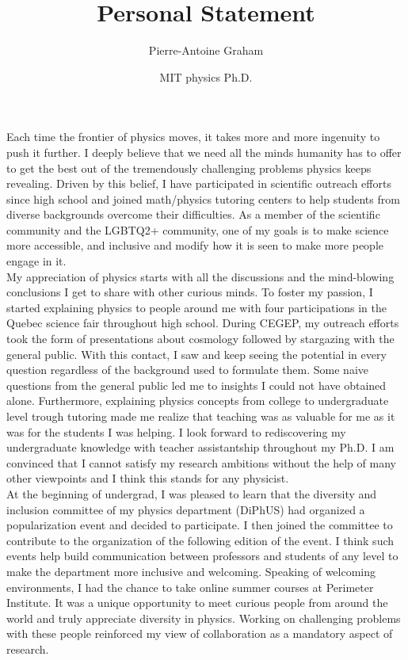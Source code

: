 \documentclass[12pt]{article}
\title{Personal Statement}
\author{Pierre-Antoine Graham}
\date{MIT physics Ph.D.}
\begin{document}
\maketitle
\vspace{0.5cm}

Each time the frontier of physics moves, it takes more and more ingenuity to push it further. I deeply believe that we need all the minds humanity has to offer to get the best out of the tremendously challenging problems physics keeps revealing. Driven by this belief, I have participated in scientific outreach efforts since high school and joined math/physics tutoring centers to help students from diverse backgrounds overcome their difficulties. As a member of the scientific community and the LGBTQ2+ community, one of my goals is to make science more accessible, and inclusive and modify how it is seen to make more people engage in it. \\

My appreciation of physics starts with all the discussions and the mind-blowing conclusions I get to share with other curious minds. To foster my passion, I started explaining physics to people around me with four participations in the Quebec science fair throughout high school. During CEGEP, my outreach efforts took the form of presentations about cosmology followed by stargazing with the general public. With this contact, I saw and keep seeing the potential in every question regardless of the background used to formulate them. Some naive questions from the general public led me to insights I could not have obtained alone. Furthermore, explaining physics concepts from college to undergraduate level trough tutoring made me realize that teaching was as valuable for me as it was for the students I was helping. I look forward to rediscovering my undergraduate knowledge with teacher assistantship throughout my Ph.D. I am convinced that I cannot satisfy my research ambitions without the help of many other viewpoints and I think this stands for any physicist.  \\

At the beginning of undergrad, I was pleased to learn that the diversity and inclusion committee of my physics department (DiPhUS) had organized a popularization event and decided to participate. I then joined the committee to contribute to the organization of the following edition of the event. I think such events help build communication between professors and students of any level to make the department more inclusive and welcoming. Speaking of welcoming environments, I had the chance to take online summer courses at Perimeter Institute. It was a unique opportunity to meet curious people from around the world and truly appreciate diversity in physics. Working on challenging problems with these people reinforced my view of collaboration as a mandatory aspect of research. \\
\end{document}
